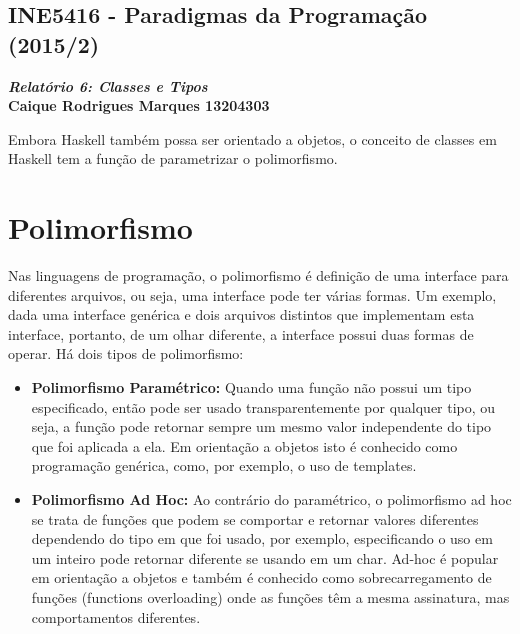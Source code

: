 \documentclass{article}
\begin{document}
\lstset{language=Haskell} %
\lstset{language=C++} %
\begin{center}
    \section*{INE5416 - Paradigmas da Programação (2015/2)}
    \textbf{\textit{Relatório 6: Classes e Tipos} \\
    Caique Rodrigues Marques 13204303}
\end{center}
    Embora Haskell também possa ser orientado a objetos, o conceito de classes
    em Haskell tem a função de parametrizar o polimorfismo.

\section*{Polimorfismo}
    Nas linguagens de programação, o polimorfismo é definição de uma interface
    para diferentes arquivos, ou seja, uma interface pode ter várias formas. Um
    exemplo, dada uma interface genérica e dois arquivos distintos que
    implementam esta interface, portanto, de um olhar diferente, a interface
    possui duas formas de operar. Há dois tipos de polimorfismo:
    \begin{itemize}
        \item \textbf{Polimorfismo Paramétrico: } Quando uma função não possui
            um tipo especificado, então pode ser usado transparentemente por
            qualquer tipo, ou seja, a função pode retornar sempre um mesmo
            valor independente do tipo que foi aplicada a ela. Em orientação a
            objetos isto é conhecido como programação genérica, como, por
            exemplo, o uso de templates.

        \item \textbf{Polimorfismo Ad Hoc:} Ao contrário do paramétrico, o
            polimorfismo ad hoc se trata de funções que podem se comportar e
            retornar valores diferentes dependendo do tipo em que foi usado,
            por exemplo, especificando o uso em um inteiro pode retornar
            diferente se usando em um char. Ad-hoc é popular em orientação a
            objetos e também é conhecido como sobrecarregamento de funções
            (functions overloading) onde as funções têm a mesma assinatura, mas
            comportamentos diferentes.
        \end{itemize}
        
\end{document}
